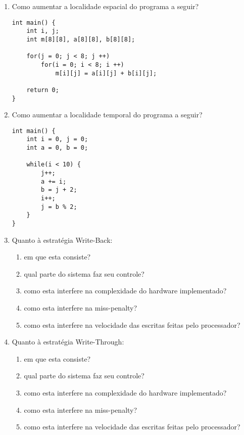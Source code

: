 \documentclass{article}
\begin{document}
\begin{enumerate}
\item Como aumentar a localidade espacial do programa a seguir?

\begin{center}
    \begin{minipage}{0.575\textwidth}
        \begin{lstlisting}[frame=single]
int main() {
    int i, j;
    int m[8][8], a[8][8], b[8][8]; 
    
    for(j = 0; j < 8; j ++)
        for(i = 0; i < 8; i ++)
            m[i][j] = a[i][j] + b[i][j];
    
    return 0;
}
        \end{lstlisting}
    \end{minipage}
\end{center}

\item Como aumentar a localidade temporal do programa a seguir?

\begin{center}
    \begin{minipage}{0.35\textwidth}
        \begin{lstlisting}[frame=single]
int main() {
    int i = 0, j = 0;
    int a = 0, b = 0;
    
    while(i < 10) {
        j++;
        a += i;
        b = j + 2;
        i++;
        j = b % 2;
    }
}
        \end{lstlisting}
    \end{minipage}
\end{center}

\item Quanto à estratégia Write-Back:
\begin{enumerate}
    \item em que esta consiste?
    \item qual parte do sistema faz seu controle?
    \item como esta interfere na complexidade do hardware implementado?
    \item como esta interfere na miss-penalty?
    \item como esta interfere na velocidade das escritas feitas pelo processador?
\end{enumerate}

\item Quanto à estratégia Write-Through:
\begin{enumerate}
    \item em que esta consiste?
    \item qual parte do sistema faz seu controle?
    \item como esta interfere na complexidade do hardware implementado?
    \item como esta interfere na miss-penalty?
    \item como esta interfere na velocidade das escritas feitas pelo processador?
\end{enumerate}


\end{enumerate}
\end{document}
